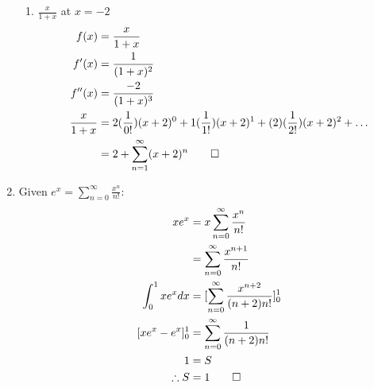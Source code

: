\documentclass[12pt, a4paper]{article}
\begin{document}
\begin{enumerate}[Q\arabic*.]
\begin{enumerate}[(\alph*)]
      \item $\displaystyle \frac{x}{1+x}$ at $x=-2$
        \begin{align*}
          f(x) &= \frac{x}{1+x}\\
          f'(x) &= \frac{1}{(1+x)^2}\\
          f''(x) &= \frac{-2}{(1+x)^3}\\
          \frac{x}{1+x} &= 2(\frac{1}{0!})(x+2)^0 + 1(\frac{1}{1!})(x+2)^1 + (2)(\frac{1}{2!})(x+2)^2 + \ldots\\
                        &= 2 + \sum^{\infty}_{n=1}(x+2)^n \qed
        \end{align*}
    \end{enumerate}
  \pagebreak
  \item 
    Given $\displaystyle e^x = \sum^{\infty}_{n=0} \frac{x^n}{n!}$:
    \begin{align*}
      xe^x &= x\sum^{\infty}_{n=0} \frac{x^n}{n!}\\
           &= \sum^{\infty}_{n=0} \frac{x^{n+1}}{n!}\\
      \int^1_0 xe^x dx &= [\sum^{\infty}_{n=0} \frac{x^{n+2}}{(n+2)n!}]^1_0\\
      [xe^x - e^x]^1_0 &= \sum^{\infty}_{n=0} \frac{1}{(n+2)n!}\\
      1 &= S\\
      \therefore S &= 1 \qed
    \end{align*}
\end{enumerate}
\end{document}
